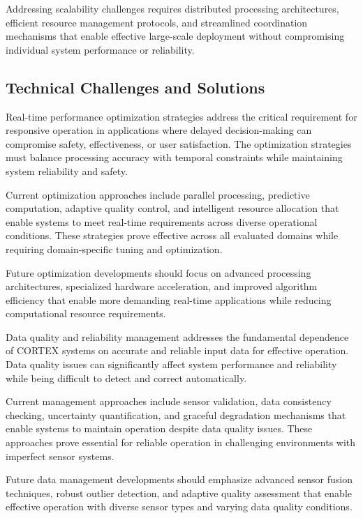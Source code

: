 Addressing scalability challenges requires distributed processing architectures, efficient resource management protocols, and streamlined coordination mechanisms that enable effective large-scale deployment without compromising individual system performance or reliability.

\subsection{Technical Challenges and Solutions}

Real-time performance optimization strategies address the critical requirement for responsive operation in applications where delayed decision-making can compromise safety, effectiveness, or user satisfaction. The optimization strategies must balance processing accuracy with temporal constraints while maintaining system reliability and safety.

Current optimization approaches include parallel processing, predictive computation, adaptive quality control, and intelligent resource allocation that enable systems to meet real-time requirements across diverse operational conditions. These strategies prove effective across all evaluated domains while requiring domain-specific tuning and optimization.

Future optimization developments should focus on advanced processing architectures, specialized hardware acceleration, and improved algorithm efficiency that enable more demanding real-time applications while reducing computational resource requirements.

Data quality and reliability management addresses the fundamental dependence of CORTEX systems on accurate and reliable input data for effective operation. Data quality issues can significantly affect system performance and reliability while being difficult to detect and correct automatically.

Current management approaches include sensor validation, data consistency checking, uncertainty quantification, and graceful degradation mechanisms that enable systems to maintain operation despite data quality issues. These approaches prove essential for reliable operation in challenging environments with imperfect sensor systems.

Future data management developments should emphasize advanced sensor fusion techniques, robust outlier detection, and adaptive quality assessment that enable effective operation with diverse sensor types and varying data quality conditions.

